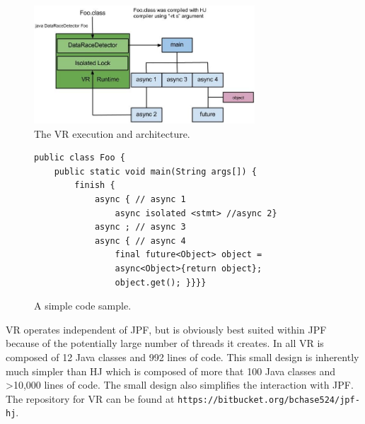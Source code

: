\begin{figure}[t]
\begin{center}
\includegraphics[width=3.25in]{../figs/CodeHierarchy}
\end{center}
\vspace{-10pt}
\caption{The VR execution and architecture.}
\label{fig:codeHierarchy}
\end{figure}

\begin{figure}
\begin{center}
{\small
\begin{verbatim}
public class Foo {
    public static void main(String args[]) {
        finish {
            async { // async 1
                async isolated <stmt> //async 2}
            async ; // async 3
            async { // async 4
                final future<Object> object = 
                async<Object>{return object};
                object.get(); }}}}
\end{verbatim}
}
\end{center}
\caption{A simple code sample.}
\label{fig:sampleCode}
\end{figure}

VR operates independent of JPF, but is obviously best suited within JPF because of the potentially large number of threads it creates. In all VR is composed of 12 Java classes and 992 lines of code. This small design is inherently much simpler than HJ which is composed of more that 100 Java classes and >10,000 lines of code. The small design also simplifies the interaction with JPF. The repository for VR can be found at \texttt{https://bitbucket.org/bchase524/jpf-hj}.



